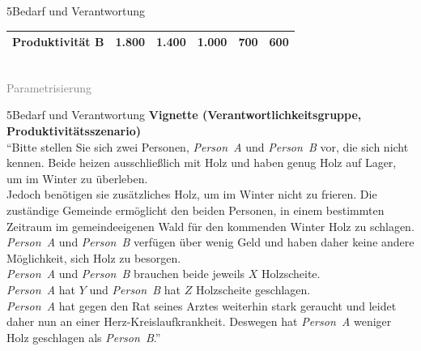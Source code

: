 \documentclass[xcolor=table,9pt,aspectratio=169]{beamer}
\begin{document}
\begin{frame}{\vspace*{10mm}5\hspace*{1em}Bedarf und Verantwortung}
\begin{center}
\begin{tabular}{lrrrrr}
      Produktivität B           &                  1.800    &                  1.400    &                  1.000    &                    700    &                    600    \\
      \hline
   \end{tabular}\\
   \smallskip
   \textcolor{gray}{Parametrisierung}
\end{center}
\end{frame}


\begin{frame}{\vspace*{10mm}5\hspace*{1em}Bedarf und Verantwortung}
\textbf{Vignette (Verantwortlichkeitsgruppe, Produktivitätsszenario)}\\
\medskip
\enquote{Bitte stellen Sie sich zwei Personen, \textit{Person~A} und \textit{Person~B} vor, die sich nicht kennen. Beide heizen ausschließlich mit Holz und haben genug Holz auf Lager, um im Winter zu überleben.\\
\medskip
Jedoch benötigen sie zusätzliches Holz, um im Winter nicht zu frieren. Die zuständige Gemeinde ermöglicht den beiden Personen, in einem bestimmten Zeitraum im gemeindeeigenen Wald für den kommenden Winter Holz zu schlagen. \textit{Person~A} und \textit{Person~B} verfügen über wenig Geld und haben daher keine andere Möglichkeit, sich Holz zu besorgen.\\
\medskip
\textit{Person~A} und \textit{Person~B} brauchen beide jeweils $X$ Holzscheite.\\
\medskip
\textit{Person~A} hat $Y$ und \textit{Person~B} hat $Z$ Holzscheite geschlagen.\\
\medskip
\textit{Person~A} hat gegen den Rat seines Arztes weiterhin stark geraucht und leidet daher nun an einer Herz-Kreislaufkrankheit. Deswegen hat \textit{Person~A} weniger Holz geschlagen als \textit{Person~B}.}
\end{frame}
\end{document}
